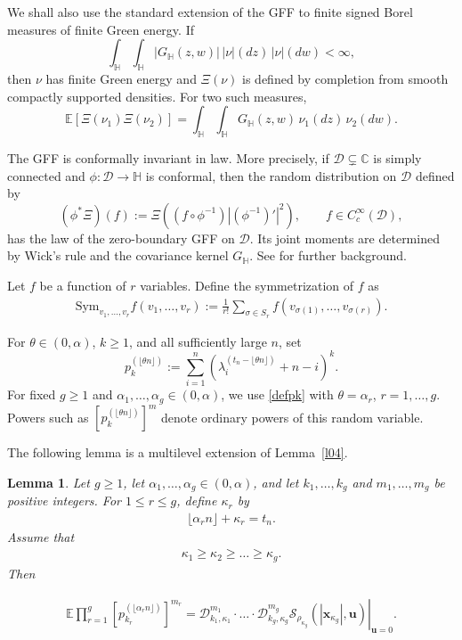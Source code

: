 \documentclass[11pt]{amsart}
\theoremstyle{plain}
\newtheorem{lemma}[theorem]{Lemma}
\newcommand\si{\sigma}
\numberwithin{equation}{section}
\numberwithin{theorem}{section}
\numberwithin{figure}{section}
\begin{document}
We shall also use the standard extension of the GFF to finite signed Borel
measures of finite Green energy. If
\[
    \int_{\mathbb H}\int_{\mathbb H}
    |G_{\mathbb H}(z,w)|\,|\nu|(dz)\,|\nu|(dw)
    <\infty,
\]
then $\nu$ has finite Green energy and $\Xi(\nu)$ is defined by
completion from smooth compactly supported densities. For two such
measures,
\begin{equation}
    \mathbb E[\Xi(\nu_1)\Xi(\nu_2)]
    =
    \int_{\mathbb H}\int_{\mathbb H}
    G_{\mathbb H}(z,w)\,\nu_1(dz)\,\nu_2(dw).
    \label{eq:gff-measure-covariance}
\end{equation}

The GFF is conformally invariant in law. More precisely, if
$\mathcal D\subsetneq\mathbb C$ is simply connected and
$\phi:\mathcal D\to\mathbb H$ is conformal, then the random distribution
on $\mathcal D$ defined by
\[
    (\phi^*\Xi)(f)
    :=
    \Xi\left(
        (f\circ\phi^{-1})\left|(\phi^{-1})'\right|^2
    \right),
    \qquad f\in C_c^\infty(\mathcal D),
\]
has the law of the zero-boundary GFF on $\mathcal D$. Its joint moments
are determined by Wick's rule and the covariance kernel
$G_{\mathbb H}$. See \cite{SS07} for further background.

 Let $f$ be a function of $r$ variables. Define the symmetrization of $f$ as
 \begin{align}
     \mathrm{Sym}_{v_1,\ldots,v_r}f(v_1,\ldots,v_r):=\frac{1}{r!}\sum_{\sigma\in S_r}f(v_{\si(1)},\ldots,v_{\si(r)}).
     \label{dsym}
 \end{align}


For $\theta\in(0,\alpha)$, $k\geq1$, and all sufficiently large $n$,
set
\begin{equation}
    p_k^{(\lfloor\theta n\rfloor)}
    :=
    \sum_{i=1}^{n}
    \left(
        \lambda_i^{(t_n-\lfloor\theta n\rfloor)}+n-i
    \right)^k.
    \label{defpk}
\end{equation}
For fixed $g\geq1$ and
$\alpha_1,\ldots,\alpha_g\in(0,\alpha)$, we use
\eqref{defpk} with $\theta=\alpha_r$, $r=1,\ldots,g$. Powers such as
$[p_k^{(\lfloor\theta n\rfloor)}]^m$ denote ordinary powers of this
random variable.


  The following lemma is a multilevel extension of Lemma~\ref{l04}.
\begin{lemma}Let $g\geq1$, let $\alpha_1,\ldots,\alpha_g\in(0,\alpha)$, and let $k_1,\ldots,k_g$ and $m_1,\ldots,m_g$ be positive integers. For $1\leq r\leq g$, define $\kappa_r$ by
\begin{align}
\lfloor\alpha_r n\rfloor+\kappa_r=t_n.\label{kal}
\end{align}
Assume that
\begin{align*}
\kappa_1\geq\kappa_2\geq\ldots\geq\kappa_g.
\end{align*}
Then
  
  \begin{align}
\mathbb{E}\prod_{r=1}^{g}\left[p_{k_r}^{(\lfloor\alpha_r n\rfloor)}\right]^{m_r}=\left.\mathcal{D}_{k_1,\kappa_1}^{m_1}\cdot\ldots\cdot\mathcal{D}_{k_g,\kappa_g}^{m_g}\mathcal{S}_{\rho_{\kappa_g}}(|\mathbf{x}_{\kappa_g}|,\mathbf{u})\right|_{\mathbf{u}=0}.\label{mmt}
\end{align} 
 \end{lemma}
\end{document}
